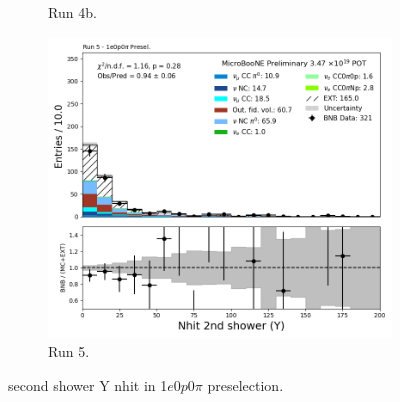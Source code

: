 \begin{figure}[H]
\begin{subfigure}[t]{0.32\linewidth}
        \caption{Run 4b.}
    \end{subfigure}%
    \hspace{0.2cm}%
    \begin{subfigure}[t]{0.32\linewidth}
        \includegraphics[width=\linewidth]{technote/Appendix_Preselection/Figures/1e0p0pi/Run5/secondshower_Y_nhit_Run5_1e0p0pi_Presel.png}
        \caption{Run 5.}
    \end{subfigure}
    \caption{second shower Y nhit in 1$e$0$p$0$\pi$ preselection.}
\end{figure}


